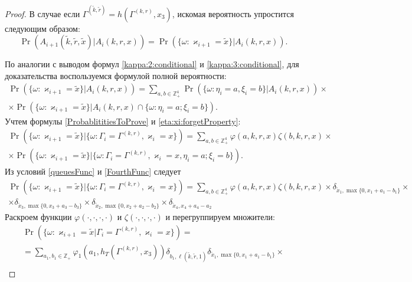 \documentclass[a4paper,12pt,russian]{extarticle}
\begin{document}
\begin{proof}
В случае если $\Gamma^{(\tilde{k},\tilde{r})}=h(\Gamma^{(k,r)},x_3)$, искомая вероятность упростится следующим образом:
\begin{equation*}
\Pr (A_{i+1}(\tilde{k},\tilde{r},\tilde{x})| A_{i}({k},{r},{x})) 
=\Pr (\{\omega\colon \varkappa_{i+1}=\tilde{x}\}|A_{i}({k},{r},{x})).
\end{equation*}

По аналогии с выводом формул \eqref{kappa:2:conditional} и \eqref{kappa:3:conditional}, для доказательства воспользуемся формулой полной вероятности:
\begin{multline*}
\Pr (\{\omega\colon\varkappa_{i+1}=\tilde{x}\}|A_i(k,r,x) )= \sum_{a,b \in \mathbb{Z}_+^4} \Pr (\{\omega\colon\eta_i=a, \xi_i=b\}|A_i(k,r,x)) \times \\ 
\times
\Pr (\{\omega\colon\varkappa_{i+1}=\tilde{x}\}|A_i(k,r,x) \cap \{\omega\colon \eta_i=a; \xi_i=b\}).
\end{multline*}
Учтем формулы \eqref{ProbablititiesToProve} и \eqref{eta:xi:forgetProperty}:
\begin{multline*}
\Pr (\{\omega\colon \varkappa_{i+1}=\tilde{x}\}|\{\omega\colon\Gamma_{i}=\Gamma^{(k,r)},\varkappa_i=x\})
=\sum_{a,b \in \mathbb{Z}_+^4} \varphi(a,k,r,x) \zeta(b,k,r,x)
\times \\ \times
\Pr (\{\omega\colon\varkappa_{i+1}=\tilde{x}\}|\{\omega\colon\Gamma_{i}=\Gamma^{(k,r)},\varkappa_i=x, \eta_i=a; \xi_i=b\}).
\end{multline*}
Из условий \eqref{queuesFunc} и \eqref{FourthFunc} следует
\begin{multline*}
\Pr (\{\omega\colon\varkappa_{i+1}=\tilde{x}\}|\{\omega\colon\Gamma_{i}=\Gamma^{(k,r)},\varkappa_i=x\})=\sum_{a,b \in \mathbb{Z}_+^4} \varphi(a,k,r,x) \zeta(b,k,r,x)
\times \delta_{\tilde{x}_1,\max{\{0,x_1+a_1-b_1\}}} \times \\
\times \delta_{\tilde{x}_3,\max{\{0,x_3+a_3-b_3\}}} \times
\delta_{\tilde{x}_2,\max{\{0,x_2+a_2-b_2\}}} \times
\delta_{\tilde{x}_4,x_4+a_4-a_2}
\end{multline*}
Раскроем  функции $\varphi(\cdot, \cdot, \cdot, \cdot)$ и $\zeta(\cdot, \cdot, \cdot, \cdot)$ и перегруппируем множители:
\begin{multline*}
\Pr (\{\omega\colon\varkappa_{i+1}=\tilde{x}|\Gamma_{i}=\Gamma^{(k,r)},\varkappa_i=x\})= \\
=\sum_{a_1,b_1 \in \mathbb{Z}_+} \varphi_1(a_1,h_T(\Gamma^{(k,r)},x_3)) \delta_{b_1,\ell(\tilde{k},\tilde{r},1)} \delta_{\tilde{x}_1,\max{\{0,x_1+a_1-b_1\}}} \times \\

\end{multline*}
\end{proof}
\end{document}
